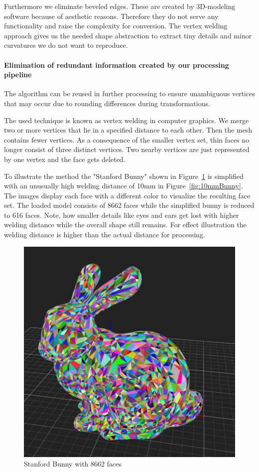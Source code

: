 \documentclass[../ClassicThesis.tex]{subfiles}
\begin{document}
Furthermore we eliminate beveled edges. These are created by 3D-modeling software because of aesthetic reasons. Therefore they do not serve any functionality and raise the complexity for conversion. The vertex welding approach gives us the needed shape abstraction to extract tiny details and minor curvatures we do not want to reproduce.

\paragraph*{Elimination of redundant information created by our processing pipeline}

The algorithm can be reused in further processing to ensure unambiguous vertices that may occur due to rounding differences during transformations.


The used technique is known as vertex welding in computer graphics. We merge two or more vertices that lie in a specified distance to each other. Then the mesh contains fewer vertices. As a consequence of the smaller vertex set, thin faces no longer consist of three distinct vertices. Two nearby vertices are just represented by one vertex and the face gets deleted.

To illustrate the method the {\threedmodel} "Stanford Bunny" shown in Figure~\ref{fig:origBunny} is simplified with an unusually high welding distance of 10mm in Figure~\ref{fig:10mmBunny}. The images display each face with a different color to visualize the resulting face set. The loaded model consists of 8662 faces while the simplified bunny is reduced to 616 faces. Note, how smaller details like eyes and ears get lost with higher welding distance while the overall shape still remains. For effect illustration the welding distance is higher than the actual distance for processing.

\begin{figure}
\includegraphics[width=0.8\columnwidth]{Images/04-approx-welding-rabbit-original.png}
\caption{Stanford Bunny with 8662 faces}
\label{fig:origBunny}
\end{figure}
\end{document}

